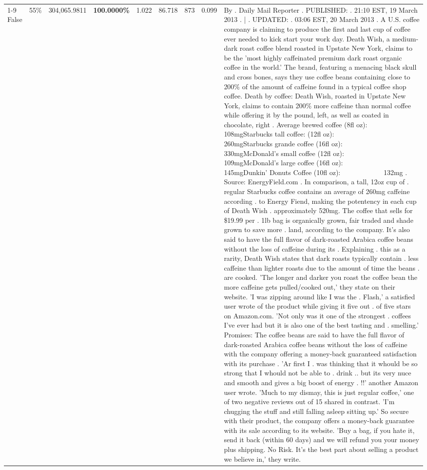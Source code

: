 \begin{table}[H]
{\begin{tabular}{lllrlllll}
\cline{1-9} \cline{2-9}
False & 55\% & 304,065.9811 & \bfseries \color{red} 100.0000\% & 1.022 & 86.718 & 873 & 0.099 & By . Daily Mail Reporter . PUBLISHED: . 21:10 EST, 19 March 2013 . | . UPDATED: . 03:06 EST, 20 March 2013 . A U.S. coffee company is claiming to produce the first and last cup of coffee ever needed to kick start your work day. Death Wish, a medium-dark roast coffee blend roasted in Upstate New York, claims to be the 'most highly caffeinated premium dark roast organic coffee in the world.' The brand, featuring a menacing black skull and cross bones, says they use coffee beans containing close to 200\% of the amount of caffeine found in a typical coffee shop coffee. Death by coffee: Death Wish, roasted in Upstate New York, claims to contain 200\% more caffeine than normal coffee while offering it by the pound, left, as well as coated in chocolate, right . Average brewed coffee (8fl oz):              108mgStarbucks tall coffee: (12fl oz):                260mgStarbucks grande coffee (16fl oz):         330mgMcDonald's small coffee (12fl oz):           109mgMcDonald's large coffee (16fl oz):           145mgDunkin' Donuts Coffee (10fl oz):             132mg . Source: EnergyField.com . In comparison, a tall, 12oz cup of . regular Starbucks coffee contains an average of 260mg caffeine according . to Energy Fiend, making the potentency in each cup of Death Wish . approximately 520mg. The coffee that sells for \$19.99 per . 1lb bag is organically grown, fair traded and shade grown to save more . land, according to the company. It's also said to have the full flavor of dark-roasted Arabica coffee beans without the loss of caffeine during its . Explaining . this as a rarity, Death Wish states that dark roasts typically contain . less caffeine than lighter roasts due to the amount of time the beans . are cooked. 'The longer and darker you roast the coffee bean the more caffeine gets pulled/cooked out,' they state on their website. 'I was zipping around like I was the . Flash,' a satisfied user wrote of the product while giving it five out . of five stars on Amazon.com. 'Not only was it one of the strongest . coffees I've ever had but it is also one of the best tasting and . smelling.’ Promises: The coffee beans are said to have the full flavor of dark-roasted Arabica coffee beans without the loss of caffeine with the company offering a money-back guaranteed satisfaction with its purchase . 'Ar first I . was thinking that it whould be so strong that I whould not be able to . drink .. but its very nuce and smooth and gives a big boost of energy . !!' another Amazon user wrote. 'Much to my dismay, this is just regular coffee,' one of two negative reviews out of 15 shared in contrast. 'I'm chugging the stuff and still falling asleep sitting up.' So secure with their product, the company offers a money-back guarantee with its sale according to its website. 'Buy a bag, if you hate it, send it back (within 60 days) and we will refund you your money plus shipping. No Risk. It’s the best part about selling a product we believe in,' they write.🍫 \\

\end{tabular}}
\end{table}
